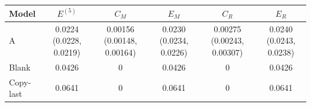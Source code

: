 \begin{tabular}{lccccc}
\toprule
Model & $E^{(5)}$ & $C_M$ & $E_M$ & $C_R$ & $E_R$ \\
\midrule
A & 0.0224 (0.0228, 0.0219) & 0.00156 (0.00148, 0.00164) & 0.0230 (0.0234, 0.0226) & 0.00275 (0.00243, 0.00307) & 0.0240 (0.0243, 0.0238) \\
Blank & 0.0426 & 0 & 0.0426 & 0 & 0.0426 \\
Copy-last & 0.0641 & 0 & 0.0641 & 0 & 0.0641 \\
\bottomrule
\end{tabular}
